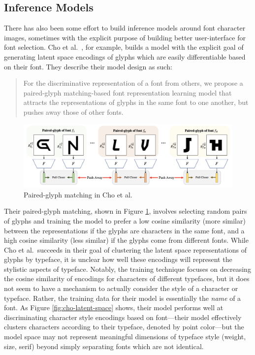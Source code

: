 \subsection{Inference Models}

There has also been some effort to build inference models around font character images, sometimes with the explicit purpose of building better user-interface for font selection. Cho et al.\ \cite{cho2022}, for example, builds a model with the explicit goal of generating latent space encodings of glyphs which are easily differentiable based on their font. They describe their model design as such:

\begin{quote}
    For the discriminative representation of a font from others, we propose a paired-glyph matching-based font representation learning model that attracts the representations of glyphs in the same font to one another, but pushes away those of other fonts.
\end{quote}

\begin{figure}
    \centering
    \includegraphics[width=1\textwidth]{images/cho-paired-glyph.png}
    \caption{Paired-glyph matching in Cho et al. \cite{cho2022}}
    \label{fig:cho-paired-glyph}
\end{figure}

Their paired-glyph matching, shown in Figure \ref{fig:cho-paired-glyph}, involves selecting random pairs of glyphs and training the model to prefer a low cosine similarity (more similar) between the representations if the glyphs are characters in the same font, and a high cosine similarity (less similar) if the glyphs come from different fonts. While Cho et al.\ succeeds in their goal of clustering the latent space representations of glyphs by typeface, it is unclear how well these encodings will represent the stylistic aspects of typeface. Notably, the training technique focuses on decreasing the cosine similarity of encodings for characters of different typefaces, but it does not seem to have a mechanism to actually consider the style of a character or typeface. Rather, the training data for their model is essentially the \emph{name} of a font. As Figure \ref{fig:cho-latent-space} shows, their model performs well at discriminating character style encodings based on font---their model effectively clusters characters according to their typeface, denoted by point color---but the model space may not represent meaningful dimensions of typeface style (weight, size, serif) beyond simply separating fonts which are not identical.

